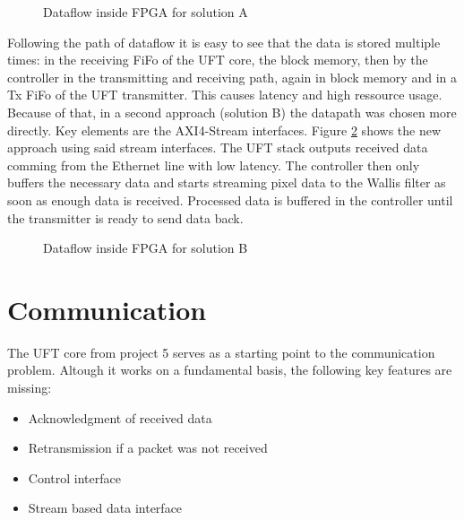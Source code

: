 \begin{figure}[t!]
    \centering
    \begin{adjustbox}{max width=\textwidth}
        
    \end{adjustbox}
    \caption{Dataflow inside FPGA for solution A}
    \label{fig:dataflowa}
\end{figure}

Following the path of dataflow it is easy to see that the data is stored
multiple
times: in the receiving FiFo of the UFT core, the block memory, then by the
controller in the transmitting and receiving path, again in block memory and in
a Tx FiFo of the UFT transmitter. This causes latency and high ressource usage.
Because of that, in a second approach (solution B) the datapath was chosen more
directly. Key elements are the AXI4-Stream interfaces. Figure \ref{fig:dataflowb}
shows the new approach using said stream interfaces. The UFT stack outputs
received data comming from the Ethernet line with low latency. The controller
then only buffers the necessary data and starts streaming pixel data to the
Wallis filter as soon as enough data is received. Processed data is buffered in
the controller until the transmitter is ready to send data back.

\begin{figure}[h!]
    \centering
    \begin{adjustbox}{max width=\textwidth}
        
    \end{adjustbox}
    \caption{Dataflow inside FPGA for solution B}
    \label{fig:dataflowb}
\end{figure}

\pagebreak

\section{Communication}
The UFT core from project 5 serves as a starting point to the communication
problem. Altough it works on a fundamental basis, the following key features are
missing:

\begin{itemize}
	\item Acknowledgment of received data
	\item Retransmission if a packet was not received
	\item Control interface
	\item Stream based data interface
\end{itemize}

